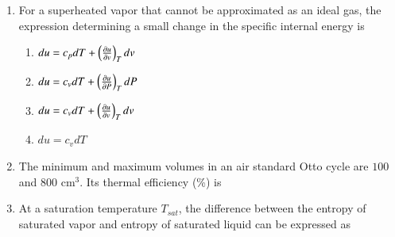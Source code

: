 \documentclass[a4paper,10pt]{article}
\begin{document}
\begin{enumerate}
    \hfill{}
    \begin{enumerate}[label=\Alph*)]
    \end{enumerate}
    
    \item For a superheated vapor that cannot be approximated as an ideal gas, the expression determining a small change in the specific internal energy is
    
    \hfill{}
    \begin{enumerate}[label=\Alph*)]
        \item $du = c_p dT + \left(\frac{\partial u}{\partial v}\right)_T dv$
        \item $du = c_v dT + \left(\frac{\partial u}{\partial P}\right)_T dP$
        \item $du = c_v dT + \left(\frac{\partial u}{\partial v}\right)_T dv$
        \item $du = c_v dT$
    \end{enumerate}
    
    \item The minimum and maximum volumes in an air standard Otto cycle are $100$ and $800$ cm$^3$. Its thermal efficiency (\%) is
    
    \hfill{}
    \begin{enumerate}[label=\Alph*)]
    \end{enumerate}

    \item At a saturation temperature $T_{sat}$, the difference between the entropy of saturated vapor and entropy of saturated liquid can be expressed as
    
    \hfill{}
    \begin{enumerate}[label=\Alph*)]
    \end{enumerate}


\end{enumerate}
\end{document}
